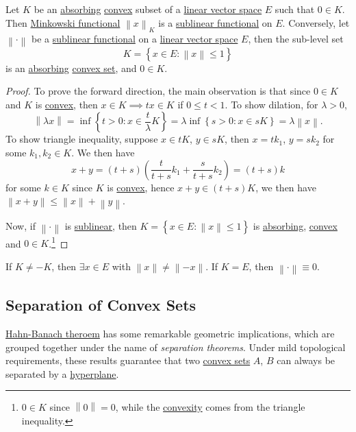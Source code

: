 \begin{proposition}
	Let \(K\) be an \hyperref[def:absorbing]{absorbing} \hyperref[def:convex-set]{convex} subset of a \hyperref[def:linear-vector-space]{linear vector space} \(E\) such that \(0\in K\). Then \hyperref[def:Minkowski-functional]{Minkowski functional} \(\left\lVert x\right\rVert _K\) is a \hyperref[def:sublinear]{sublinear functional} on \(E\). Conversely, let \(\left\lVert \cdot\right\rVert \) be a \hyperref[def:sublinear]{sublinear functional} on a \hyperref[def:linear-vector-space]{linear vector space} \(E\), then the sub-level set
	\[
		K = \left\{ x\in E\colon \left\lVert x\right\rVert \leq 1 \right\}
	\]
	is an \hyperref[def:absorbing]{absorbing} \hyperref[def:convex-set]{convex set}, and \(0\in K\).
\end{proposition}
\begin{proof}
	To prove the forward direction, the main observation is that since \(0\in K\) and \(K\) is \hyperref[def:convex-set]{convex}, then \(x\in K \implies tx\in K\) if \(0 \leq t < 1\). To show dilation, for \(\lambda > 0\),
	\[
		\left\lVert \lambda x\right\rVert
		= \inf \left\{ t> 0\colon x \in \frac{t}{\lambda }K \right\}
		= \lambda \inf \left\{ s > 0\colon x \in sK \right\} = \lambda \left\lVert x\right\rVert.
	\]
	To show triangle inequality, suppose \(x\in tK\), \(y\in sK\), then \(x = tk_1\), \(y = sk_2\) for some \(k_1, k_2\in K\). We then have
	\[
		x + y = (t + s) \left( \frac{t}{t+s}k_1 + \frac{s}{t+s}k_2 \right) = (t + s) k
	\]
	for some \(k\in K\) since \(K\) is \hyperref[def:convex-set]{convex}, hence \(x + y \in (t + s) K\), we then have \(\left\lVert x + y\right\rVert \leq \left\lVert x\right\rVert + \left\lVert y\right\rVert \).

	Now, if \(\left\lVert \cdot\right\rVert \) is \hyperref[def:sublinear]{sublinear}, then \(K = \left\{ x\in E\colon \left\lVert x\right\rVert \leq 1 \right\} \) is \hyperref[def:absorbing]{absorbing}, \hyperref[def:convex-set]{convex} and \(0\in K\).\footnote{\(0\in K\) since \(\left\lVert 0\right\rVert = 0\), while the \hyperref[def:convex-set]{convexity} comes from the triangle inequality.}
\end{proof}

\begin{remark}
	If \(K \neq -K\), then \(\exists x\in E\) with \(\left\lVert x\right\rVert \neq \left\lVert -x\right\rVert \). If \(K = E\), then \(\left\lVert \cdot \right\rVert \equiv 0\).
\end{remark}

\subsection{Separation of Convex Sets}
\hyperref[thm:Hahn-Banach]{Hahn-Banach theroem} has some remarkable geometric implications, which are grouped together under the name of \emph{separation theorems}. Under mild topological requirements, these results guarantee that two \hyperref[def:convex-set]{convex sets} \(A\), \(B\) can always be separated by a \hyperref[def:hyperplane]{hyperplane}.

